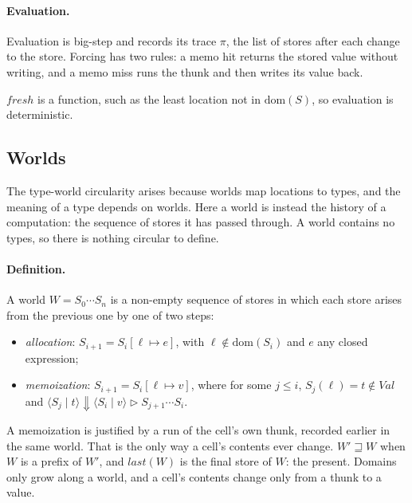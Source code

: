 \documentclass[11pt]{article}
\newcommand{\lam}[2]{\lambda #1{:}#2.\,}
\newcommand{\prom}[1]{\lceil #1 \rceil}
\newcommand{\frc}[1]{\lfloor #1 \rfloor}
\newcommand{\last}[1]{\mathit{last}(#1)}
\newcommand{\ext}{\sqsupseteq}
\newcommand{\cfg}[2]{\langle #1 \mid #2 \rangle}
\newcommand{\evals}[5]{\cfg{#1}{#2} \Downarrow \cfg{#3}{#4} \mathrel{\triangleright} #5}
\newcommand{\fresh}{\mathit{fresh}}
\newcommand{\Val}{\mathit{Val}}
\begin{document}
\paragraph{Evaluation.}
Evaluation is big-step and records its trace $\pi$, the list of stores
after each change to the store. Forcing has two rules: a memo hit returns the
stored value without writing, and a memo miss runs the thunk and then writes
its value back.
$\fresh$ is a function, such as the least location not in $\mathrm{dom}(S)$,
so evaluation is deterministic.

\subsection{Worlds}

The type-world circularity arises because worlds map locations to types, and
the meaning of a type depends on worlds. Here a world is instead the history
of a computation: the sequence of stores it has passed through. A world
contains no types, so there is nothing circular to define.

\paragraph{Definition.}
A world $W = S_0 \cdots S_n$ is a non-empty sequence of stores in which
each store arises from the previous one by one of two steps:
\begin{itemize}
  \item \emph{allocation}: $S_{i+1} = S_i[\ell \mapsto e]$, with
    $\ell \notin \mathrm{dom}(S_i)$ and $e$ any closed expression;
  \item \emph{memoization}: $S_{i+1} = S_i[\ell \mapsto v]$, where for some
    $j \leq i$, $S_j(\ell) = t \notin \Val$ and
    $\evals{S_j}{t}{S_i}{v}{S_{j+1} \cdots S_i}$.
\end{itemize}
A memoization is justified by a run of the cell's own thunk, recorded
earlier in the same world. That is the only way a cell's contents ever
change. $W' \ext W$ when $W$ is a prefix of $W'$, and $\last{W}$ is the final
store of $W$: the present. Domains only grow along a world, and a cell's contents change
only from a thunk to a value.
\end{document}
